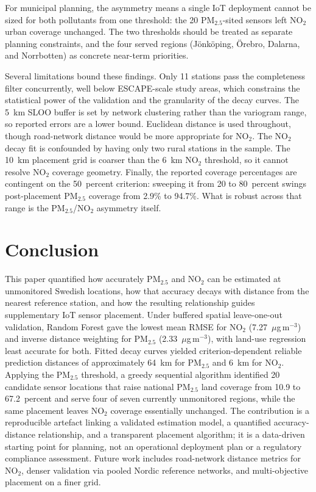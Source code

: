 \documentclass[conference]{IEEEtran}
\begin{document}
For municipal planning, the asymmetry means a single IoT deployment cannot be
sized for both pollutants from one threshold: the 20 PM$_{2.5}$-sited sensors
left NO$_2$ urban coverage unchanged. The two thresholds should be treated as
separate planning constraints, and the four served regions (J\"onk\"oping,
\"Orebro, Dalarna, and Norrbotten) as concrete near-term priorities.

Several limitations bound these findings. Only 11 stations pass the
completeness filter concurrently, well below ESCAPE-scale study areas, which
constrains the statistical power of the validation and the granularity of the
decay curves. The 5~km SLOO buffer is set by network clustering rather than
the variogram range, so reported errors are a lower bound. Euclidean distance
is used throughout, though road-network distance would be more appropriate for
NO$_2$. The NO$_2$ decay fit is confounded by having only two rural stations
in the sample. The 10~km placement grid is coarser than the 6~km NO$_2$
threshold, so it cannot resolve NO$_2$ coverage geometry. Finally, the
reported coverage percentages are contingent on the 50~percent criterion:
sweeping it from 20 to 80~percent swings post-placement PM$_{2.5}$ coverage
from 2.9\% to 94.7\%. What is robust across that range is the
PM$_{2.5}$/NO$_2$ asymmetry itself.

\section{Conclusion}
\label{sec:conclusion}

This paper quantified how accurately PM$_{2.5}$ and NO$_2$ can be estimated at
unmonitored Swedish locations, how that accuracy decays with distance from the
nearest reference station, and how the resulting relationship guides
supplementary IoT sensor placement. Under buffered spatial leave-one-out
validation, Random Forest gave the lowest mean RMSE for NO$_2$
(7.27~$\mu$g\,m$^{-3}$) and inverse distance weighting for PM$_{2.5}$
(2.33~$\mu$g\,m$^{-3}$), with land-use regression least accurate for both.
Fitted decay curves yielded criterion-dependent reliable prediction distances
of approximately 64~km for PM$_{2.5}$ and 6~km for NO$_2$. Applying the
PM$_{2.5}$ threshold, a greedy sequential algorithm identified 20 candidate
sensor locations that raise national PM$_{2.5}$ land coverage from 10.9 to
67.2~percent and serve four of seven currently unmonitored regions, while the
same placement leaves NO$_2$ coverage essentially unchanged. The contribution
is a reproducible artefact linking a validated estimation model, a quantified
accuracy-distance relationship, and a transparent placement algorithm; it is a
data-driven starting point for planning, not an operational deployment plan or
a regulatory compliance assessment. Future work includes road-network distance
metrics for NO$_2$, denser validation via pooled Nordic reference networks,
and multi-objective placement on a finer grid.
\end{document}
